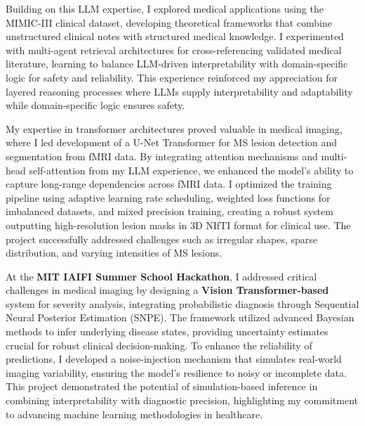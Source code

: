 \documentclass[a4,10pt]{article}
\begin{document}
\begin{large}
\par
\vspace{-0.25cm} \quad Building on this LLM expertise, I explored medical applications using the MIMIC-III clinical dataset, developing theoretical frameworks that combine unstructured clinical notes with structured medical knowledge. I experimented with multi-agent retrieval architectures for cross-referencing validated medical literature, learning to balance LLM-driven interpretability with domain-specific logic for safety and reliability. This experience reinforced my appreciation for layered reasoning processes where LLMs supply interpretability and adaptability while domain-specific logic ensures safety.
\par
\vspace{-0.25cm} \quad My expertise in transformer architectures proved valuable in medical imaging, where I led development of a U-Net Transformer for MS lesion detection and segmentation from fMRI data. By integrating attention mechanisms and multi-head self-attention from my LLM experience, we enhanced the model's ability to capture long-range dependencies across fMRI data. I optimized the training pipeline using adaptive learning rate scheduling, weighted loss functions for imbalanced datasets, and mixed precision training, creating a robust system outputting high-resolution lesion masks in 3D NIfTI format for clinical use. The project successfully addressed challenges such as irregular shapes, sparse distribution, and varying intensities of MS lesions.
\par

\vspace{-0.25cm} \quad At the\textbf{ MIT IAIFI Summer School Hackathon}, I addressed critical challenges in medical imaging by designing a \textbf{Vision Transformer-based} system for severity analysis, integrating probabilistic diagnosis through Sequential Neural Posterior Estimation (SNPE). The framework utilized advanced Bayesian methods to infer underlying disease states, providing uncertainty estimates crucial for robust clinical decision-making. To enhance the reliability of predictions, I developed a noise-injection mechanism that simulates real-world imaging variability, ensuring the model's resilience to noisy or incomplete data. This project demonstrated the potential of simulation-based inference in combining interpretability with diagnostic precision, highlighting my commitment to advancing machine learning methodologies in healthcare. \par



\end{large}
\end{document}
